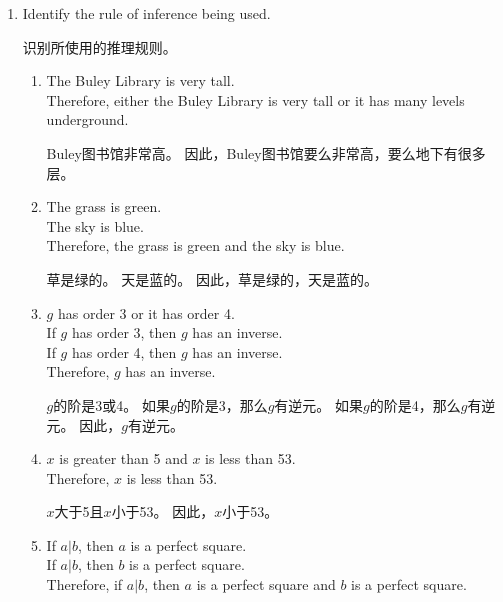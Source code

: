 \begin{enumerate}
  \workbookpagebreak
  
  \item Identify the rule of inference being used.
  
  识别所使用的推理规则。
  \begin{enumerate}
  \item The Buley Library is very tall.\\
  Therefore, either the Buley Library is very tall or it has many
  levels underground.
  
  Buley图书馆非常高。\newline
  因此，Buley图书馆要么非常高，要么地下有很多层。
  \wbvfill
  
  \item The grass is green.\\
  The sky is blue.\\
  Therefore, the grass is green and the sky is blue.
  
  草是绿的。\newline
  天是蓝的。\newline
  因此，草是绿的，天是蓝的。
  \wbvfill
  
  \item $g$ has order 3 or it has order 4.\\
  If $g$ has order 3, then $g$ has an inverse.\\
  If $g$ has order 4, then $g$ has an inverse.\\
  Therefore, $g$ has an inverse.
  
  $g$的阶是3或4。\newline
  如果$g$的阶是3，那么$g$有逆元。\newline
  如果$g$的阶是4，那么$g$有逆元。\newline
  因此，$g$有逆元。
  \wbvfill
  
  \item $x$ is greater than 5 and $x$ is less than 53.\\
  Therefore, $x$ is less than 53.
  
  $x$大于5且$x$小于53。\newline
  因此，$x$小于53。
  
  \wbvfill
  
  \item If $a|b$, then $a$ is a perfect square.\\
  If $a|b$, then $b$ is a perfect square.\\
  Therefore, if $a|b$, then $a$ is a perfect square and $b$ is
  a perfect square.
  

\end{enumerate}
\end{enumerate}

